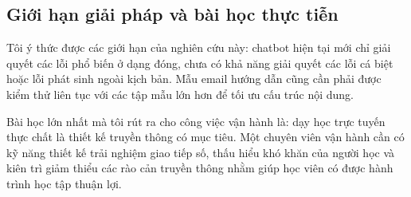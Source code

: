 \subsection{Giới hạn giải pháp và bài học thực tiễn}

Tôi ý thức được các giới hạn của nghiên cứu này: chatbot hiện tại mới chỉ giải quyết các lỗi phổ biến ở dạng đóng, chưa có khả năng giải quyết các lỗi cá biệt hoặc lỗi phát sinh ngoài kịch bản. Mẫu email hướng dẫn cũng cần phải được kiểm thử liên tục với các tập mẫu lớn hơn để tối ưu cấu trúc nội dung.

Bài học lớn nhất mà tôi rút ra cho công việc vận hành là: dạy học trực tuyến thực chất là thiết kế truyền thông có mục tiêu. Một chuyên viên vận hành cần có kỹ năng thiết kế trải nghiệm giao tiếp số, thấu hiểu khó khăn của người học và kiên trì giảm thiểu các rào cản truyền thông nhằm giúp học viên có được hành trình học tập thuận lợi.
